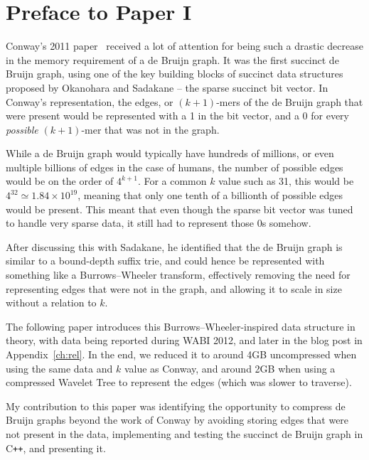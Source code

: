 \chapter*{Preface to Paper I}

Conway's 2011 paper~\cite{conway} received a lot of attention for being such a drastic decrease in the memory requirement of a de Bruijn graph. It was the first succinct de Bruijn graph, using one of the key building blocks of succinct data structures proposed by Okanohara and Sadakane \cite{bitvector} -- the sparse succinct bit vector. In Conway's representation, the edges, or $(k+1)$-mers of the de Bruijn graph that were present would be represented with a 1 in the bit vector, and a 0 for every \emph{possible} $(k+1)$-mer that was not in the graph.

While a de Bruijn graph would typically have hundreds of millions, or even multiple billions of edges in the case of humans, the number of possible edges would be on the order of $4^{k+1}$. For a common $k$ value such as 31, this would be $4^{32} \simeq 1.84 \times 10^{19}$, meaning that only one tenth of a billionth of possible edges would be present. This meant that even though the sparse bit vector was tuned to handle very sparse data, it still had to represent those 0s somehow.

After discussing this with Sadakane, he identified that the de Bruijn graph is similar to a bound-depth suffix trie, and could hence be represented with something like a Burrows--Wheeler transform, effectively removing the need for representing edges that were not in the graph, and allowing it to scale in size without a relation to $k$.

The following paper introduces this Burrows--Wheeler-inspired data structure in theory, with data being reported during WABI 2012, and later in the blog post in Appendix~\ref{ch:rel}. In the end, we reduced it to around 4GB uncompressed when using the same data and $k$ value as Conway, and around 2GB when using a compressed Wavelet Tree to represent the edges (which was slower to traverse).

My contribution to this paper was identifying the opportunity to compress de Bruijn graphs beyond the work of Conway by avoiding storing edges that were not present in the data, implementing and testing the succinct de Bruijn graph in C\texttt{++}, and presenting it.

